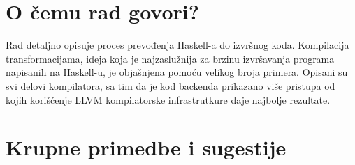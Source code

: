 \documentclass[a4paper]{report}
\begin{document}
	
	\section{O čemu rad govori?}
	Rad detaljno opisuje proces prevođenja Haskell-a do izvršnog koda. Kompilacija transformacijama, ideja koja je najzaslužnija za brzinu izvršavanja programa napisanih na Haskell-u, je objašnjena pomoću velikog broja primera. Opisani su svi delovi kompilatora, sa tim da je kod backenda prikazano više pristupa od kojih korišćenje LLVM kompilatorske infrastrutkure daje najbolje rezultate.
	
	\section{Krupne primedbe i sugestije}
\end{document}
